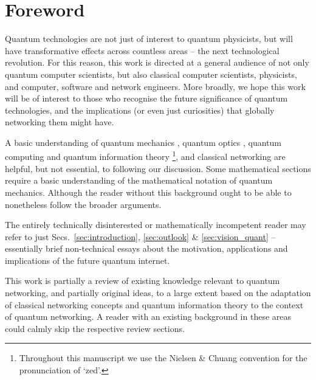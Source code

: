 \documentclass[aps,rmp,twocolumn,amsmath,amssymb,nofootinbib,superscriptaddress,longbibliography,floatfix,table-of-contents,eqsecnum]{revtex4-1}
\begin{document}
\maketitle

%
%

\tableofcontents 

%
%

\section{Foreword}

Quantum technologies are not just of interest to quantum physicists, but will have transformative effects across countless areas -- the next technological revolution. For this reason, this work is directed at a general audience of not only quantum computer scientists, but also classical computer scientists, physicists, and computer, software and network engineers. More broadly, we hope this work will be of interest to those who recognise the future significance of quantum technologies, and the implications (or even just curiosities) that globally networking them might have.

A basic understanding of quantum mechanics \cite{bib:Sakurai94}, quantum optics \cite{bib:GerryKnight05}, quantum computing and quantum information theory \cite{bib:NielsenChuang00}\footnote{Throughout this manuscript we use the Nielsen \& Chuang convention for the pronunciation of `zed'.}, and classical networking \cite{bib:TanenbaumNet} are helpful, but not essential, to following our discussion. Some mathematical sections require a basic understanding of the mathematical notation of quantum mechanics. Although the reader without this background ought to be able to nonetheless follow the broader arguments.

The entirely technically disinterested or mathematically incompetent reader may refer to just Secs.~\ref{sec:introduction}, \ref{sec:outlook} \& \ref{sec:vision_quant} -- essentially brief non-technical essays about the motivation, applications and implications of the future quantum internet.

This work is partially a review of existing knowledge relevant to quantum networking, and partially original ideas, to a large extent based on the adaptation of classical networking concepts and quantum information theory to the context of quantum networking. A reader with an existing background in these areas could calmly skip the respective review sections.
\end{document}
